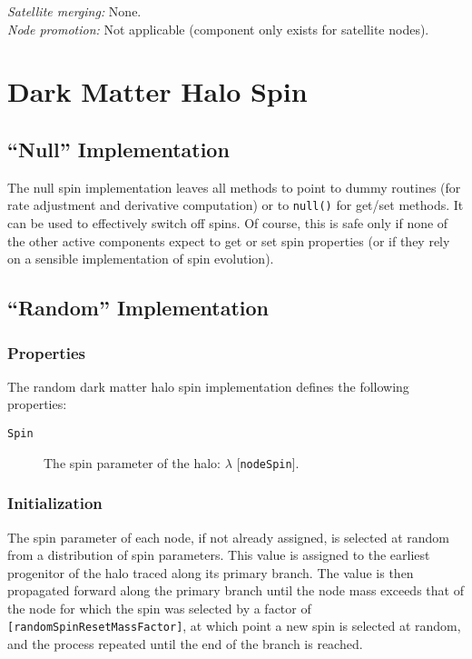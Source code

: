\noindent\emph{Satellite merging:} None.\\

\noindent\emph{Node promotion:} Not applicable (component only exists for satellite nodes).\\

\section{Dark Matter Halo Spin}\label{sec:DarkMatterHaloSpinComponent}

\subsection{``Null'' Implementation}

The null spin implementation leaves all methods to point to dummy routines (for rate adjustment and derivative computation) or to {\tt null()} for get/set methods. It can be used to effectively switch off spins. Of course, this is safe only if none of the other active components expect to get or set spin properties (or if they rely on a sensible implementation of spin evolution).

\subsection{``Random'' Implementation}

\subsubsection{Properties}

The random dark matter halo spin implementation defines the following properties:
\begin{description}
 \item [{\tt Spin}] The spin parameter of the halo: $\lambda$ [{\tt nodeSpin}].
\end{description}

\subsubsection{Initialization}

The spin parameter of each node, if not already assigned, is selected at random from a distribution of spin parameters. This value is assigned to the earliest progenitor of the halo traced along its primary branch. The value is then propagated forward along the primary branch until the \gls{node} mass exceeds that of the \gls{node} for which the spin was selected by a factor of {\tt [randomSpinResetMassFactor]}, at which point a new spin is selected at random, and the process repeated until the end of the branch is reached. 

